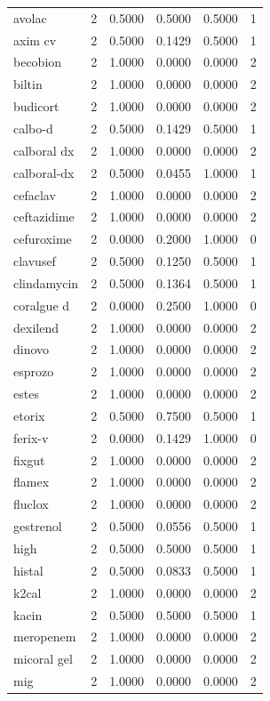 \begin{longtable}{p{3.0cm}rrrrr}
avolac & 2 & 0.5000 & 0.5000 & 0.5000 & 1 \\
axim cv & 2 & 0.5000 & 0.1429 & 0.5000 & 1 \\
becobion & 2 & 1.0000 & 0.0000 & 0.0000 & 2 \\
biltin & 2 & 1.0000 & 0.0000 & 0.0000 & 2 \\
budicort & 2 & 1.0000 & 0.0000 & 0.0000 & 2 \\
calbo-d & 2 & 0.5000 & 0.1429 & 0.5000 & 1 \\
calboral dx & 2 & 1.0000 & 0.0000 & 0.0000 & 2 \\
calboral-dx & 2 & 0.5000 & 0.0455 & 1.0000 & 1 \\
cefaclav & 2 & 1.0000 & 0.0000 & 0.0000 & 2 \\
ceftazidime & 2 & 1.0000 & 0.0000 & 0.0000 & 2 \\
cefuroxime & 2 & 0.0000 & 0.2000 & 1.0000 & 0 \\
clavusef & 2 & 0.5000 & 0.1250 & 0.5000 & 1 \\
clindamycin & 2 & 0.5000 & 0.1364 & 0.5000 & 1 \\
coralgue d & 2 & 0.0000 & 0.2500 & 1.0000 & 0 \\
dexilend & 2 & 1.0000 & 0.0000 & 0.0000 & 2 \\
dinovo & 2 & 1.0000 & 0.0000 & 0.0000 & 2 \\
esprozo & 2 & 1.0000 & 0.0000 & 0.0000 & 2 \\
estes & 2 & 1.0000 & 0.0000 & 0.0000 & 2 \\
etorix & 2 & 0.5000 & 0.7500 & 0.5000 & 1 \\
ferix-v & 2 & 0.0000 & 0.1429 & 1.0000 & 0 \\
fixgut & 2 & 1.0000 & 0.0000 & 0.0000 & 2 \\
flamex & 2 & 1.0000 & 0.0000 & 0.0000 & 2 \\
fluclox & 2 & 1.0000 & 0.0000 & 0.0000 & 2 \\
gestrenol & 2 & 0.5000 & 0.0556 & 0.5000 & 1 \\
high & 2 & 0.5000 & 0.5000 & 0.5000 & 1 \\
histal & 2 & 0.5000 & 0.0833 & 0.5000 & 1 \\
k2cal & 2 & 1.0000 & 0.0000 & 0.0000 & 2 \\
kacin & 2 & 0.5000 & 0.5000 & 0.5000 & 1 \\
meropenem & 2 & 1.0000 & 0.0000 & 0.0000 & 2 \\
micoral gel & 2 & 1.0000 & 0.0000 & 0.0000 & 2 \\
mig & 2 & 1.0000 & 0.0000 & 0.0000 & 2 \\

\end{longtable}
